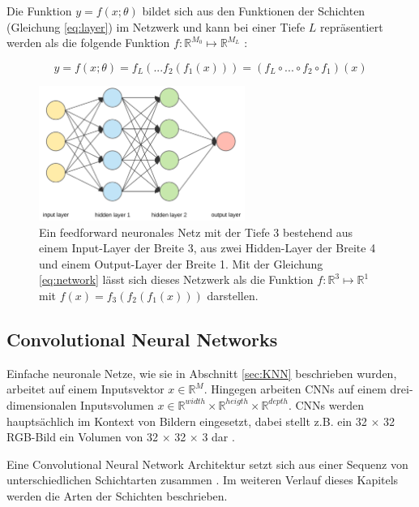 Die Funktion $y = f(x; \theta)$ bildet sich aus den Funktionen der Schichten (Gleichung \ref{eq:layer}) im Netzwerk und kann bei einer Tiefe $L$ repräsentiert werden als die folgende Funktion $f :  \mathbb{R}^{M_0} \mapsto \mathbb{R}^{M_L}$ \cite{Goodfellow-et-al-2016, bauckhageInformedMachineLearning}:
 
\begin{equation}
\label{eq:network}
y = f(x; \theta)=  f_L(...f_2(f_1(x))) = (f_L \circ ... \circ f_2 \circ f_1)(x)
\end{equation}





\begin{figure}[hbt]
	\centering
	\includegraphics[width=0.6\textwidth]{images/neural_net.png}
	\caption{Ein feedforward neuronales Netz mit der Tiefe 3 bestehend aus einem Input-Layer der Breite 3, aus zwei Hidden-Layer der Breite 4 und einem Output-Layer der Breite 1. Mit der Gleichung \ref{eq:network}  lässt sich dieses Netzwerk als die Funktion $f :  \mathbb{R}^{3} \mapsto \mathbb{R}^{1}$ mit $f(x)=f_3(f_2(f_1(x)))$ darstellen. }
	\label{fig:neural_net}
\end{figure}

\subsection{Convolutional Neural Networks}

Einfache neuronale Netze, wie sie in Abschnitt \ref{sec:KNN} beschrieben wurden, arbeitet auf einem Inputsvektor $x \in \mathbb{R}^{M}$. Hingegen arbeiten CNNs auf einem drei-dimensionalen Inputsvolumen $x \in \mathbb{R}^{width} \times \mathbb{R}^{heigth} \times \mathbb{R}^{depth}$. CNNs werden hauptsächlich im Kontext von Bildern eingesetzt, dabei stellt z.B. ein 32 $\times$ 32 RGB-Bild ein Volumen von 32 $\times$ 32 $\times$ 3 dar \cite{CS231nConvolutionalNeurala}.

Eine Convolutional Neural Network Architektur setzt sich aus einer Sequenz von unterschiedlichen Schichtarten zusammen \cite{CS231nConvolutionalNeurala}. Im weiteren Verlauf dieses Kapitels werden die Arten der Schichten beschrieben.

